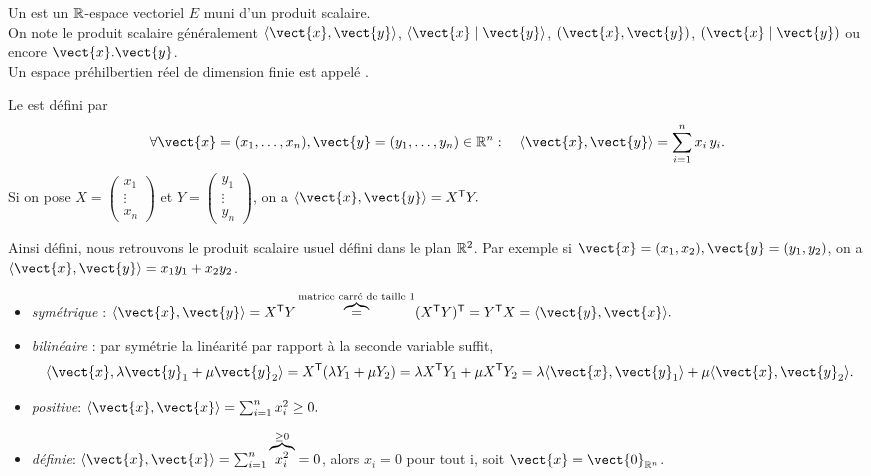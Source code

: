 \documentclass{book}
\begin{document}
\begin{Definition}
Un   est un $\mathbb{R} $-espace vectoriel $E$ muni d'un produit scalaire.\\
On note le produit scalaire généralement $\langle \vect{x}, \vect{y} \rangle$, $\langle \vect{x} \mid \vect{y} \rangle$, $(\vect{x},\vect{y})$, $(\vect{x}\mid \vect{y})$ ou encore $\vect{x}.\vect{y}$.\\
Un espace préhilbertien réel de dimension finie est appelé .
\end{Definition}
\begin{DefinitionProposition}
Le  est défini par  
$$\forall \vect{x} = ( x_1, \dots, x_n),\vect{y} =( y_1, \dots, y_n) \in\R^n :\quad \PS{\vect{x}}{\vect{y}} =\sum_{i=1}^n x_i \, y_i.  $$
Si on pose $X=\begin{pmatrix}
x_1\\ \vdots \\ x_n 
\end{pmatrix}$ et $Y=\begin{pmatrix}
y_1\\ \vdots \\ y_n 
\end{pmatrix}$, on a $\PS{\vect{x}}{\vect{y}}=\transposee{X}Y.$
\end{DefinitionProposition}
Ainsi défini, nous retrouvons le produit scalaire usuel défini dans le plan $\mathbb{R}^2$. Par exemple si $\vect{x} = ( x_1, x_2),\vect{y} =( y_1, y_2)$, on a  $\PS{\vect{x}}{\vect{y}} =x_1 y_1+x_2 y_2$.
\begin{Demonstration}
\begin{itemize}
\item \emph{symétrique} : $\PS{\vect{x}}{\vect{y}}=\transposee{X}Y  \overbrace{=}^{\text{matrice carré de taille 1}} \transposee{(\transposee{X}Y)} = \transposee{Y}X =\PS{\vect{y}}{\vect{x}}.$
\item \emph{bilinéaire} : par symétrie la linéarité par rapport à la seconde variable suffit,   $$\PS{\vect{x}}{\lambda \vect{y}_1+\mu \vect{y}_2}=\transposee{X}(\lambda Y_1+\mu Y_2)  =\lambda \transposee{X} Y_1+\mu \transposee{X} Y_2=\lambda \PS{\vect{x}}{\vect{y}_1}+\mu \PS{\vect{x}}{\vect{y}_2}  .$$
\item \emph{positive}: $\PS{\vect{x}}{\vect{x}}=\sum_{i=1}^n x_i^2 \geq 0.$
\item \emph{définie}: $\PS{\vect{x}}{\vect{x}}=\sum_{i=1}^n \overbrace{x_i^2}^{\geq 0} = 0$, alors  $x_i=0$ pour tout i, soit $\vect{x}=\vect{0}_{\R^n}$.
\end{itemize}
\end{Demonstration}
\end{document}
